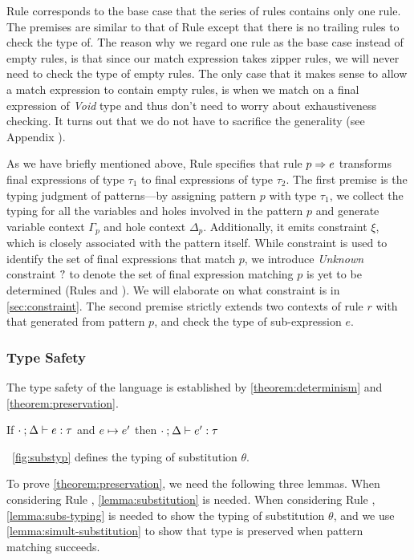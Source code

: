 Rule \TOneRules corresponds to the base case that the series of rules contains
only one rule. The premises are similar to that of Rule \TRules except that
there is no trailing rules to check the type of. The reason why we regard one
rule as the base case instead of empty rules, is that since our match expression
takes zipper rules, we will never need to check the type of empty rules. The
only case that it makes sense to allow a match expression to contain empty
rules, is when we match on a final expression of \textit{Void} type and thus
don't need to worry about exhaustiveness checking. It turns out that we do not
have to sacrifice the generality (see Appendix ).

As we have briefly mentioned above, Rule \TRule specifies that rule
$p \Rightarrow e$ transforms final expressions of type $\tau_1$ to final expressions
of type $\tau_2$. The first premise is the typing judgment of patterns---by
assigning pattern $p$ with type $\tau_1$, we collect the typing for all the
variables and holes involved in the pattern $p$ and generate variable context
$\Gamma_p$ and hole context $\Delta_p$. Additionally, it emits constraint $\xi$,
which is closely associated with the pattern itself. While constraint is used to
identify the set of final expressions that match $p$, we introduce
\textit{Unknown} constraint $\mathtt{?}$ to denote the set of final expression
matching $p$ is yet to be determined (Rules \PTEHole and \PTHole). We will elaborate on what constraint is in
\autoref{sec:constraint}. The second premise strictly extends two contexts of
rule $r$ with that generated from pattern $p$, and check the type of
sub-expression $e$.

\subsubsection{Type Safety}
The type safety of the language is established by
\autoref{theorem:determinism} and \autoref{theorem:preservation}.

\begin{theorem}[Preservation]
  \label{theorem:preservation}
  If $\cdot \mathbin{;} \Delta \vdash e : \tau$ and $e \mapsto e'$
  then $\cdot \mathbin{;} \Delta \vdash e' : \tau$
\end{theorem}



\figurename~\ref{fig:substyp} defines the typing of substitution $\theta$.

To prove \autoref{theorem:preservation}, we need the following three lemmas.
When considering Rule \ITAp, \autoref{lemma:substitution} is needed.
When considering Rule \ITSuccMatch, \autoref{lemma:subs-typing} is needed
to show the typing of substitution $\theta$, and we use
\autoref{lemma:simult-substitution} to show that type is preserved when pattern
matching succeeds.

